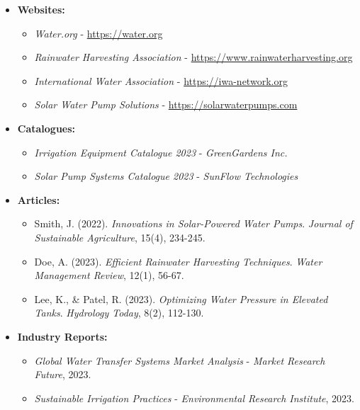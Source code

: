 \documentclass[12pt]{article}
\begin{document}
    \begin{itemize}
        \item \textbf{Websites:}
        \begin{itemize}
            \item \textit{Water.org} - \url{https://water.org}
            \item \textit{Rainwater Harvesting Association} - \url{https://www.rainwaterharvesting.org}
            \item \textit{International Water Association} - \url{https://iwa-network.org}
            \item \textit{Solar Water Pump Solutions} - \url{https://solarwaterpumps.com}
        \end{itemize}
        
        \item \textbf{Catalogues:}
        \begin{itemize}
            \item \textit{Irrigation Equipment Catalogue 2023} - \textit{GreenGardens Inc.}
            \item \textit{Solar Pump Systems Catalogue 2023} - \textit{SunFlow Technologies}
        \end{itemize}
        
        \item \textbf{Articles:}
        \begin{itemize}
            \item Smith, J. (2022). \textit{Innovations in Solar-Powered Water Pumps}. \textit{Journal of Sustainable Agriculture}, 15(4), 234-245.
            \item Doe, A. (2023). \textit{Efficient Rainwater Harvesting Techniques}. \textit{Water Management Review}, 12(1), 56-67.
            \item Lee, K., & Patel, R. (2023). \textit{Optimizing Water Pressure in Elevated Tanks}. \textit{Hydrology Today}, 8(2), 112-130.
        \end{itemize}
        
        \item \textbf{Industry Reports:}
        \begin{itemize}
            \item \textit{Global Water Transfer Systems Market Analysis} - \textit{Market Research Future}, 2023.
            \item \textit{Sustainable Irrigation Practices} - \textit{Environmental Research Institute}, 2023.
        \end{itemize}
    \end{itemize}
    
\end{document}
